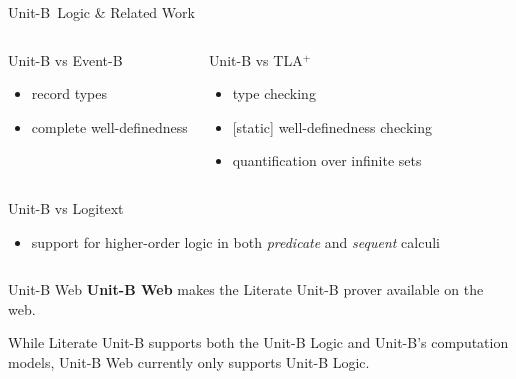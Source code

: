 \documentclass[11pt]{beamer}
\newcommand{\unitb}{Unit-B\xspace}
\newcommand{\eventb}{Event-B\xspace}
\newcommand{\tla}{TLA${}^+$\xspace}
\begin{document}
\begin{frame}[fragile]{\unitb\ Logic \& Related Work}
  \begin{columns}[T,onlytextwidth]
      \begin{block}{\unitb vs \eventb~\cite{DBLP:books/daglib/0024570}}
        \begin{itemize}
          \item record types
          \item complete well-definedness
      \end{itemize}
      \end{block}
      \pause


      \begin{block}{\unitb vs \tla~\cite{DBLP:books/aw/Lamport2002}}
        \begin{itemize}
          \item type checking
          \item {[static]} well-definedness checking
          \item quantification over infinite sets\footnotemark
        \end{itemize}
      \end{block}
  \end{columns}
  \pause
  \begin{columns}[T,onlytextwidth]

      \begin{block}{\unitb vs Logitext}
        \begin{itemize}
        \item support for higher-order logic in both \emph{predicate}
        and \emph{sequent} calculi
        \end{itemize}
      \end{block}
  \end{columns}
\end{frame}

\begin{frame}[fragile]{\unitb Web}
  \textbf{\unitb Web} makes the Literate \unitb prover available on
  the web.\newline \pause

  While Literate \unitb supports both the \unitb Logic and \unitb's computation
  models, \unitb Web currently only supports \unitb Logic.
\end{frame}
\end{document}
